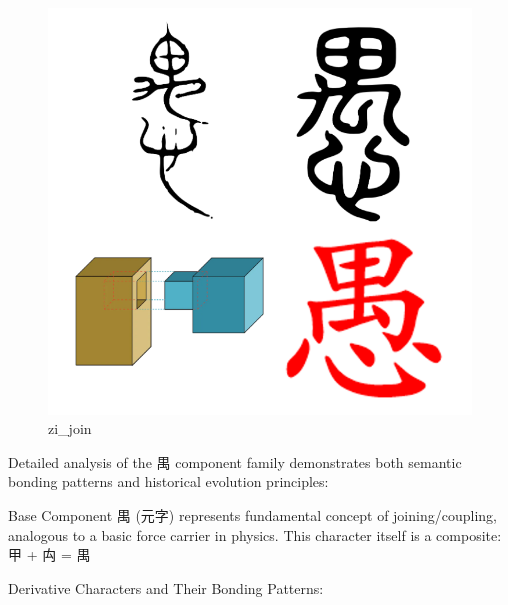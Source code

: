 \documentclass[
  11pt,
  letterpaper,
]{article}
\begin{document}
\begin{figure}
\centering
\includegraphics{./images/zi_join.png}
\caption{zi\_join}
\end{figure}

Detailed analysis of the 禺 component family demonstrates both semantic
bonding patterns and historical evolution principles:

Base Component 禺 (元字) represents fundamental concept of
joining/coupling, analogous to a basic force carrier in physics. This
character itself is a composite: 甲 + 禸 = 禺

Derivative Characters and Their Bonding Patterns:
\end{document}
